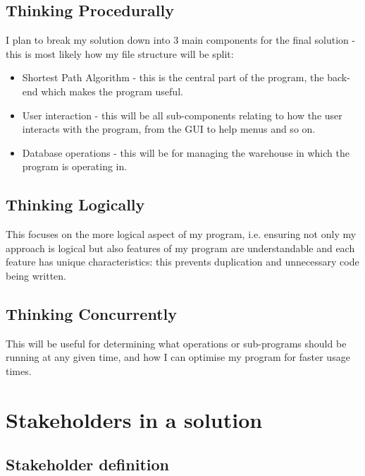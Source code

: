 \subsection{Thinking Procedurally}

I plan to break my solution down into 3 main components for the final solution - this is most likely how my file structure will be split:
\begin{itemize}
    \item Shortest Path Algorithm - this is the central part of the program, the back-end which makes the program useful.
    \item User interaction - this will be all sub-components relating to how the user interacts with the program, from the GUI to help menus and so on.
    \item Database operations - this will be for managing the warehouse in which the program is operating in.
\end{itemize}

\subsection{Thinking Logically}

This focuses on the more logical aspect of my program, i.e. ensuring not only my approach is logical but also features of my program are understandable and each feature has unique characteristics: this prevents duplication and unnecessary code being written.

\subsection{Thinking Concurrently}
This will be useful for determining what operations or sub-programs should be running at any given time, and how I can optimise my program for faster usage times.



\section{Stakeholders in a solution} 

\subsection{Stakeholder definition}

